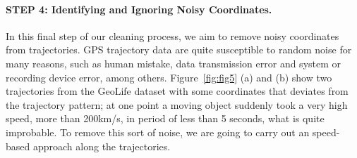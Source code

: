\documentclass[a4paper,12pt]{article}
\begin{document}
\paragraph{STEP 4: Identifying and Ignoring Noisy Coordinates.}
In this final step of our cleaning process, we aim to remove noisy coordinates from trajectories. GPS trajectory data are quite susceptible to random noise for many reasons, such as human mistake, data transmission error and system or recording device error, among others. Figure~\ref{fig:fig5} (a) and (b) show two trajectories from the GeoLife dataset with some coordinates that deviates from the trajectory pattern; at one point a moving object suddenly took a very high speed, more than 200km/s, in period of less than 5 seconds, what is quite improbable. To remove this sort of noise, we are going to carry out an speed-based approach along the trajectories. 
	
\end{document}
